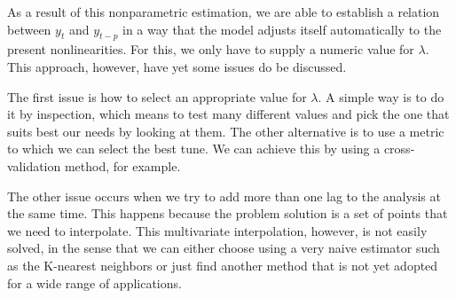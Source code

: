 As a result of this nonparametric estimation, we are able to establish a relation between $y_t$ and $y_{t-p}$ in a way that the model adjusts itself automatically to the present nonlinearities. For this, we only have to supply a numeric value for $\lambda$. This approach, however, have yet some issues do be discussed. 

The first issue is how to select an appropriate value for $\lambda$. A simple way is to do it by inspection, which means to test many different values and pick the one that suits best our needs by looking at them. The other alternative is to use a metric to which we can select the best tune. We can achieve this by using a cross-validation method, for example.

The other issue occurs when we try to add more than one lag to the analysis at the same time. This happens because the problem solution is a set of points that we need to interpolate. This multivariate interpolation, however, is not easily solved, in the sense that we can either choose using a very naive estimator such as the K-nearest neighbors or just find another method that is not yet adopted for a wide range of applications.

